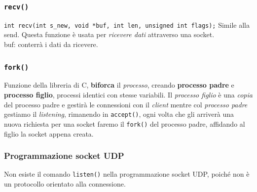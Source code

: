 \subsubsection*{\texttt{recv()}}
\texttt{int recv(int s\_new, void *buf, int len, unsigned int flags);}
Simile alla send. Questa funzione è usata per \textit{ricevere dati} attraverso una socket. \\
buf: conterrà i dati da ricevere.

\subsubsection*{\texttt{fork()}}
Funzione della libreria di C, \textbf{biforca} il \textit{processo}, creando \textbf{processo padre} e \textbf{processo figlio}, processi identici con stesse variabili. Il \textit{processo figlio} è una \textit{copia} del processo padre e gestirà le connessioni con il \textit{client} mentre col \textit{processo padre} gestiamo il \textit{listening}, rimanendo in \texttt{accept()}, ogni volta che gli arriverà una nuova richiesta per una socket faremo il \texttt{fork()} del processo padre, affidando al figlio la socket appena creata.

\subsubsection{Programmazione socket UDP}
Non esiste il comando \texttt{listen()} nella programmazione socket UDP, poiché non è un protocollo orientato alla connessione.
